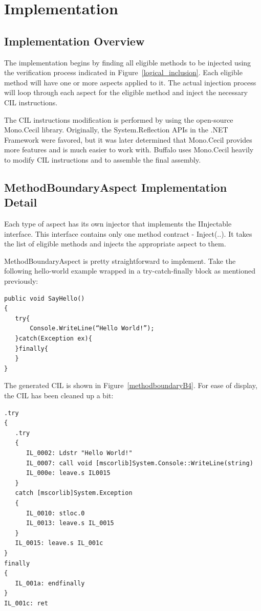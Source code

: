 \chapter{Implementation}

\section{Implementation Overview}

The implementation begins by finding all eligible methods to be injected using the verification process indicated in Figure~\ref{logical_inclusion}. Each eligible method will have one or more aspects applied to it. The actual injection process will loop through each aspect for the eligible method and inject the necessary CIL instructions.

The CIL instructions modification is performed by using the open-source Mono.Cecil library. Originally, the System.Reflection APIs in the .NET Framework were favored, but it was later determined that Mono.Cecil provides more features and is much easier to work with. Buffalo uses Mono.Cecil heavily to modify CIL instructions and to assemble the final assembly.

\section{MethodBoundaryAspect Implementation Detail}

Each type of aspect has its own injector that implements the IInjectable interface. This interface contains only one method contract - Inject(..). It takes the list of eligible methods and injects the appropriate aspect to them.

MethodBoundaryAspect is pretty straightforward to implement. Take the following hello-world example wrapped in a try-catch-finally block as mentioned previously:

\begin{lstlisting}[caption={SayHello Function}, label=sayhello]
public void SayHello()
{
   try{
       Console.WriteLine(“Hello World!”);
   }catch(Exception ex){
   }finally{
   }
}
\end{lstlisting}

The generated CIL is shown in Figure~\ref{methodboundaryB4}. For ease of display, the CIL has been cleaned up a bit:

\begin{lstlisting}[caption={CIL Generated for Sample C\# Function}, label=methodboundaryB4]
.try
{
   .try
   {
      IL_0002: Ldstr "Hello World!"
      IL_0007: call void [mscorlib]System.Console::WriteLine(string)
      IL_000e: leave.s IL0015
   }
   catch [mscorlib]System.Exception
   {
      IL_0010: stloc.0
      IL_0013: leave.s IL_0015
   }
   IL_0015: leave.s IL_001c
}
finally
{
   IL_001a: endfinally
}
IL_001c: ret
\end{lstlisting}

